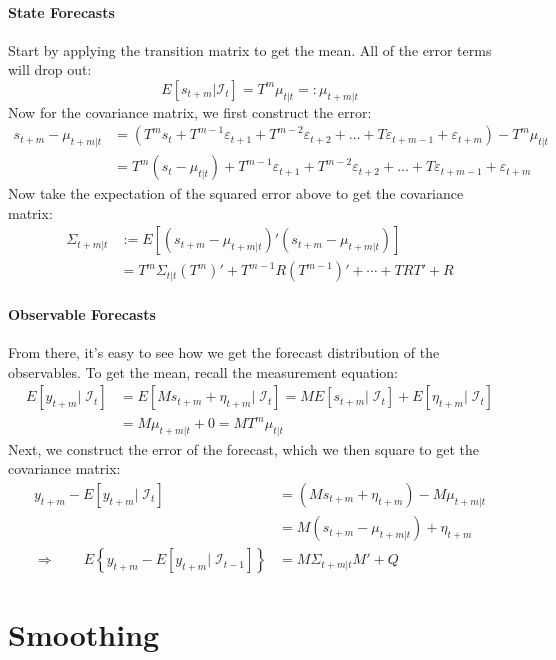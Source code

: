 \documentclass[a4paper,12pt]{article}
\begin{document}
\paragraph{State Forecasts} Start by applying the transition matrix to get the mean. All of the error terms will drop out:
\[
  E[s_{t+m} | \mathcal{I}_{t}] = 
  T^m \mu_{t|t} =: \mu_{t+m|t}
\]
Now for the covariance matrix, we first construct the error:
\begin{align*}
  s_{t+m} - \mu_{t+m|t} &= 
  \left(T^m s_t + T^{m-1} \varepsilon_{t+1}
  + T^{m-2} \varepsilon_{t+2} + \ldots
  + T\varepsilon_{t+m-1} + \varepsilon_{t+m}\right) 
  - T^m \mu_{t|t}\\
  &= T^m (s_t-\mu_{t|t}) + T^{m-1} \varepsilon_{t+1}
  + T^{m-2} \varepsilon_{t+2} + \ldots
  + T\varepsilon_{t+m-1} + \varepsilon_{t+m}
\end{align*}
Now take the expectation of the squared error above to get the covariance matrix:
\begin{align*}
  \Sigma_{t+m|t} &:=
    E[(s_{t+m} - \mu_{t+m|t})'(s_{t+m} - \mu_{t+m|t})]\\
    &= T^m \Sigma_{t|t} (T^m)' + T^{m-1}R(T^{m-1})'
      + \cdots + TRT' + R
\end{align*}

\paragraph{Observable Forecasts} From there, it's easy to see how we get the forecast distribution of the observables. To get the mean, recall the measurement equation:
\begin{align*}
  E[y_{t+m}|\;\mathcal{I}_{t}] &= 
    E[Ms_{t+m} + \eta_{t+m}|\;\mathcal{I}_{t}]
    = ME[s_{t+m}|\;\mathcal{I}_{t}]
    + E[\eta_{t+m}|\;\mathcal{I}_{t}]\\
  &= M\mu_{t+m|t} + 0 = M T^m \mu_{t|t}
\end{align*}
Next, we construct the error of the forecast, which we then square to get the covariance matrix:
\begin{align*}
  y_{t+m} - E[y_{t+m}|\;\mathcal{I}_{t}] &= 
    \left(Ms_{t+m} + \eta_{t+m}\right) 
    - M\mu_{t+m|t}\\
  &= M\left(s_{t+m}-\mu_{t+m|t}\right) + \eta_{t+m}\\
  \Rightarrow\qquad
  E\left\{y_{t+m} - E[y_{t+m}|\;\mathcal{I}_{t-1}]
  \right\} &= M\Sigma_{t+m|t}M' + Q
\end{align*}


\clearpage
\section{Smoothing}
\end{document}

